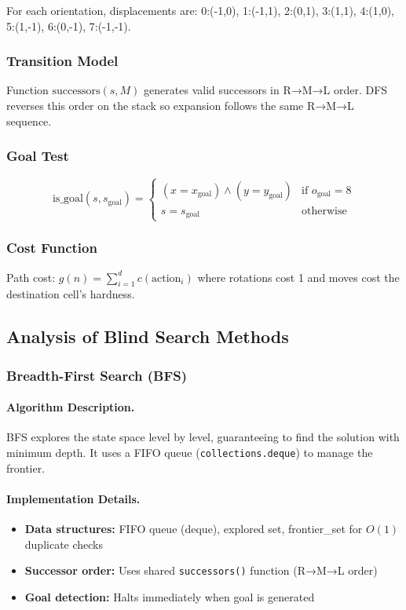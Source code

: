 \documentclass[11pt,a4paper]{article}
\begin{document}
For each orientation, displacements are: 0:(-1,0), 1:(-1,1), 2:(0,1), 3:(1,1), 4:(1,0), 5:(1,-1), 6:(0,-1), 7:(-1,-1).

\subsubsection{Transition Model}
Function $\text{successors}(s, M)$ generates valid successors in R→M→L order. DFS reverses this order on the stack so expansion follows the same R→M→L sequence.

\subsubsection{Goal Test}
$$\text{is\_goal}(s, s_{\text{goal}}) = \begin{cases}
(x = x_{\text{goal}}) \land (y = y_{\text{goal}}) & \text{if } o_{\text{goal}} = 8 \\
s = s_{\text{goal}} & \text{otherwise}
\end{cases}$$

\subsubsection{Cost Function}
Path cost: $g(n) = \sum_{i=1}^{d} c(\text{action}_i)$ where rotations cost 1 and moves cost the destination cell's hardness.

\subsection{Analysis of Blind Search Methods}

\subsubsection{Breadth-First Search (BFS)}

\paragraph{Algorithm Description.}
BFS explores the state space level by level, guaranteeing to find the solution with minimum depth. It uses a FIFO queue (\texttt{collections.deque}) to manage the frontier.

\paragraph{Implementation Details.}
\begin{itemize}[leftmargin=1.5cm,itemsep=0.1em]
    \item \textbf{Data structures:} FIFO queue (deque), explored set, frontier\_set for $O(1)$ duplicate checks
    \item \textbf{Successor order:} Uses shared \texttt{successors()} function (R→M→L order)
    \item \textbf{Goal detection:} Halts immediately when goal is generated
\end{itemize}
\end{document}
